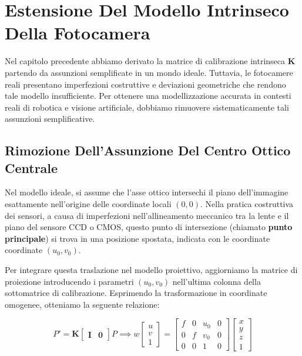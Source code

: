 ﻿\documentclass[11pt, a4paper]{article}
\begin{document}
\section{Estensione Del Modello Intrinseco Della Fotocamera}

Nel capitolo precedente abbiamo derivato la matrice di calibrazione intrinseca $\bm{K}$ partendo da assunzioni semplificate in un mondo ideale. Tuttavia, le fotocamere reali presentano imperfezioni costruttive e deviazioni geometriche che rendono tale modello insufficiente. Per ottenere una modellizzazione accurata in contesti reali di robotica e visione artificiale, dobbiamo rimuovere sistematicamente tali assunzioni semplificative.



\subsection{Rimozione Dell'Assunzione Del Centro Ottico Centrale}

Nel modello ideale, si assume che l'asse ottico intersechi il piano dell'immagine esattamente nell'origine delle coordinate locali $(0,0)$. Nella pratica costruttiva dei sensori, a causa di imperfezioni nell'allineamento meccanico tra la lente e il piano del sensore CCD o CMOS, questo punto di intersezione (chiamato \textbf{punto principale}) si trova in una posizione spostata, indicata con le coordinate coordinate $(u_0, v_0)$.


Per integrare questa traslazione nel modello proiettivo, aggiorniamo la matrice di proiezione introducendo i parametri $(u_0, v_0)$ nell'ultima colonna della sottomatrice di calibrazione. Esprimendo la trasformazione in coordinate omogenee, otteniamo la seguente relazione:

\begin{equation}
P' = \bm{K} \begin{bmatrix} \bm{I} & \bm{0} \end{bmatrix} P \implies w \begin{bmatrix} u \\ v \\ 1 \end{bmatrix} = \begin{bmatrix} f & 0 & u_0 & 0 \\ 0 & f & v_0 & 0 \\ 0 & 0 & 1 & 0 \end{bmatrix} \begin{bmatrix} x \\ y \\ z \\ 1 \end{bmatrix}
\end{equation}
\end{document}
